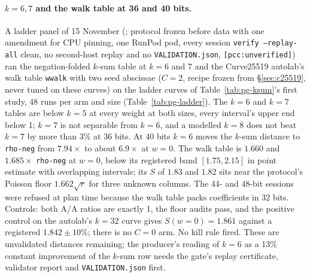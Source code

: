 \paragraph{$k=6,7$ and the walk table at 36 and 40 bits.} A ladder panel of
15 November (;
protocol frozen before data with one amendment for CPU pinning, one RunPod
pod, every session \texttt{verify --replay-all} clean, no second-host replay
and no \texttt{VALIDATION.json}, \texttt{[pcc:unverified]}) ran the
negation-folded $k$-sum table at $k=6$ and 7 and the Curve25519 autolab's
walk table \texttt{wwalk} with two seed abscissae ($C=2$, recipe frozen
from \S\ref{sec:c25519}, never tuned on these curves) on the ladder curves of
Table~\ref{tab:pg-ksum}'s first study, 48 runs per arm and size
(Table~\ref{tab:pg-ladder}). The $k=6$ and $k=7$ tables are below $k=5$ at
every weight at both sizes, every interval's upper end below 1; $k=7$ is not
separable from $k=6$, and a modelled $k=8$ does not beat $k=7$ by more than
3\% at 36 bits. At 40 bits $k=6$ moves the $k$-sum distance to
\texttt{rho-neg} from $7.94\times$ to about $6.9\times$ at $w=0$. The walk
table is $1.660$ and $1.685\times$ \texttt{rho-neg} at $w=0$, below its
registered band $[1.75,2.15]$ in point estimate with overlapping intervals;
its $S$ of $1.83$ and $1.82$ sits near the protocol's Poisson floor
$1.662\sqrt r$ for three unknown columns. The 44- and 48-bit sessions were
refused at plan time because the walk table packs coefficients in 32 bits.
Controls: both A/A ratios are exactly 1, the floor audits pass, and the
positive control on the autolab's $k=32$ curve gives $S(w=0)=1.861$ against
a registered $1.842\pm10\%$; there is no $C=0$ arm. No kill rule fired.
These are unvalidated distances remaining; the producer's reading of
$k=6$ as a 13\% constant improvement of the $k$-sum row needs the gate's
replay certificate, validator report and \texttt{VALIDATION.json} first.

